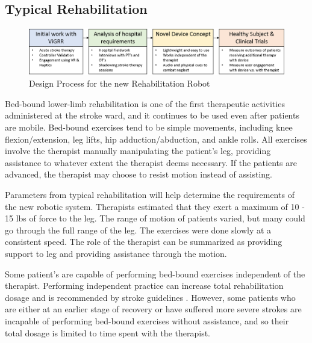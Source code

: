 \documentclass[12pt]{report}
\begin{document}
	\subsection{Typical Rehabilitation}
	
	\begin{figure}[h] 
		\centering
		\includegraphics[width=\linewidth]{design_diagram}
		\caption{Design Process for the new Rehabilitation Robot}
		\label{fig:design_diagram}
	\end{figure}
	
	Bed-bound lower-limb rehabilitation is one of the first therapeutic activities administered at the stroke ward, and it continues to be used even after patients are mobile. Bed-bound exercises tend to be simple movements, including knee flexion/extension, leg lifts, hip adduction/abduction, and ankle rolls. All exercises involve the therapist manually manipulating the patient's leg, providing assistance to whatever extent the therapist deems necessary. If the patients are advanced, the therapist may choose to resist motion instead of assisting. 
	
	Parameters from typical rehabilitation will help determine the requirements of the new robotic system. Therapists estimated that they exert a maximum of 10 - 15 lbs of force to the leg. The range of motion of patients varied, but many could go through the full range of the leg. The exercises were done slowly at a consistent speed. The role of the therapist can be summarized as providing support to leg and providing assistance through the motion. 
	
	Some patient's are capable of performing bed-bound exercises independent of the therapist. Performing independent practice can increase total rehabilitation dosage and is recommended by stroke guidelines \cite{Hebert2016}. However, some patients who are either at an earlier stage of recovery or have suffered more severe strokes are incapable of performing bed-bound exercises without assistance, and so their total dosage is limited to time spent with the therapist. 
	
\end{document}
